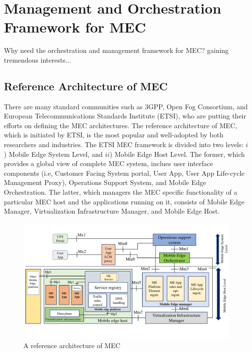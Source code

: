 \section{Management and Orchestration Framework for MEC} \label{framework}

Why need the orchestration and management framework for MEC? gaining tremendous interests...


\subsection{Reference Architecture of MEC}

There are many standard communities such as 3GPP, Open Fog Consortium, and European Telecommunications Standards Institute (ETSI), who are putting their efforts on defining the MEC architectures. 
The reference architecture of MEC, which is initiated by ETSI, is the most popular and well-adopted by both researchers and industries. The ETSI MEC framework is divided into two levels: $i$) Mobile Edge System Level, and $ii$) Mobile Edge Host Level. The former, which provides a global view of complete MEC system, inclues user interface components (i.e, Customer Facing System portal, User App, User App Life-cycle Management Proxy), Operations Support System, and Mobile Edge Orchestration. The latter, which managers the MEC specific functionality of a particular MEC host and the applications running on it, consists of Mobile Edge Manager, Virtualization Infrastructure Manager, and Mobile Edge Host.


\begin{figure}[H]
  \begin{center}
   \includegraphics[width=15cm]{./figures/book-etsi-mec.pdf}
   \caption{A reference architecture of MEC}
   \label{fig:etsi-mec}
   \end{center}
\end{figure}


